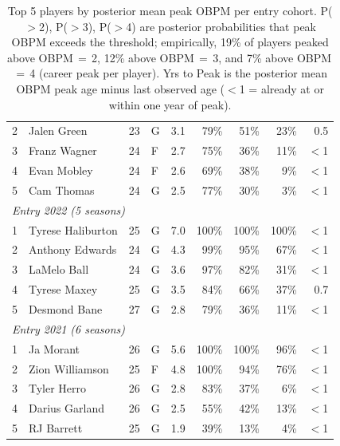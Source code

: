 \begin{table}[htbp]
\begin{tabular}{rlrlrrrrr}
    2 & Jalen Green & 23 & G & 3.1 & 79\% & 51\% & 23\% & 0.5 \\
    3 & Franz Wagner & 24 & F & 2.7 & 75\% & 36\% & 11\% & $<$1 \\
    4 & Evan Mobley & 24 & F & 2.6 & 69\% & 38\% & 9\% & $<$1 \\
    5 & Cam Thomas & 24 & G & 2.5 & 77\% & 30\% & 3\% & $<$1 \\
    \midrule[0.4pt]
    \multicolumn{9}{l}{\textit{Entry 2022 (5 seasons)}} \\
    \midrule
    1 & Tyrese Haliburton & 25 & G & 7.0 & 100\% & 100\% & 100\% & $<$1 \\
    2 & Anthony Edwards & 24 & G & 4.3 & 99\% & 95\% & 67\% & $<$1 \\
    3 & LaMelo Ball & 24 & G & 3.6 & 97\% & 82\% & 31\% & $<$1 \\
    4 & Tyrese Maxey & 25 & G & 3.5 & 84\% & 66\% & 37\% & 0.7 \\
    5 & Desmond Bane & 27 & G & 2.8 & 79\% & 36\% & 11\% & $<$1 \\
    \midrule[0.4pt]
    \multicolumn{9}{l}{\textit{Entry 2021 (6 seasons)}} \\
    \midrule
    1 & Ja Morant & 26 & G & 5.6 & 100\% & 100\% & 96\% & $<$1 \\
    2 & Zion Williamson & 25 & F & 4.8 & 100\% & 94\% & 76\% & $<$1 \\
    3 & Tyler Herro & 26 & G & 2.8 & 83\% & 37\% & 6\% & $<$1 \\
    4 & Darius Garland & 26 & G & 2.5 & 55\% & 42\% & 13\% & $<$1 \\
    5 & RJ Barrett & 25 & G & 1.9 & 39\% & 13\% & 4\% & $<$1 \\
    \bottomrule
  \end{tabular}
  \caption{Top 5 players by posterior mean peak OBPM per entry cohort. P($>$2), P($>$3), P($>$4) are posterior probabilities that peak OBPM exceeds the threshold; empirically, 19\% of players peaked above OBPM\,$=$\,2, 12\% above OBPM\,$=$\,3, and 7\% above OBPM\,$=$\,4 (career peak per player). Yrs to Peak is the posterior mean OBPM peak age minus last observed age ($<$1 = already at or within one year of peak).}
  \label{tab:breakout_cohort}
\end{table}

